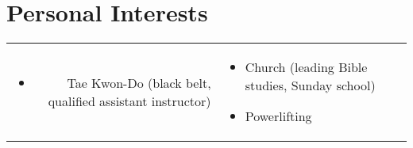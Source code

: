\section*{Personal Interests}

\begin{tabular}{rl}

\parbox[t]{0.5\textwidth}{
    \begin{itemize}
        \item Tae Kwon-Do (black belt, qualified assistant instructor)
    \end{itemize}
}

&

\parbox[t]{0.5\textwidth}{
    \begin{itemize}
        \item Church (leading Bible studies, Sunday school)
        \item Powerlifting
    \end{itemize}
}

\end{tabular}